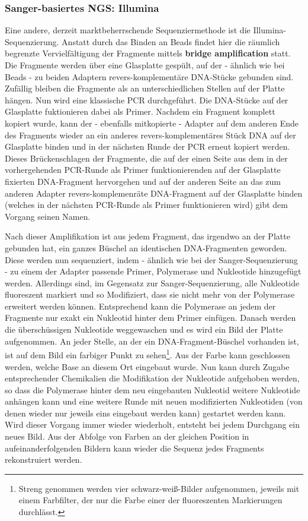 \subsubsection{Sanger-basiertes NGS: Illumina}

Eine andere, derzeit marktbeherrschende Sequenziermethode ist die Illumina-Sequenzierung. Anstatt durch das Binden an Beads findet hier die räumlich begrenzte Vervielfältigung der Fragmente mittels \textbf{bridge amplification} statt. Die Fragmente werden über eine Glasplatte gespült, auf der - ähnlich wie bei Beads - zu beiden Adaptern revers-komplementäre DNA-Stücke gebunden sind. Zufällig bleiben die Fragmente als an unterschiedlichen Stellen auf der Platte hängen. Nun wird eine klassische PCR durchgeführt. Die DNA-Stücke auf der Glasplatte fuktionieren dabei als Primer. Nachdem ein Fragment komplett kopiert wurde, kann der - ebenfalls mitkopierte - Adapter auf dem anderen Ende des Fragments wieder an ein anderes revers-komplementäres Stück DNA auf der Glasplatte binden und in der nächsten Runde der PCR erneut kopiert werden. Dieses Brückenschlagen der Fragmente, die auf der einen Seite aus dem in der vorhergehenden PCR-Runde als Primer funktionierenden auf der Glasplatte fixierten DNA-Fragment hervorgehen und auf der anderen Seite an das zum anderen Adapter revers-komplemenräte DNA-Fragment auf der Glasplatte binden (welches in der nächsten PCR-Runde als Primer funktionieren wird) gibt dem Vorgang seinen Namen.

Nach dieser Amplifikation ist aus jedem Fragment, das irgendwo an der Platte gebunden hat, ein ganzes Büschel an identischen DNA-Fragmenten geworden. Diese werden nun sequenziert, indem - ähnlich wie bei der Sanger-Sequenzierung - zu einem der Adapter passende Primer, Polymerase und Nukleotide hinzugefügt werden. Allerdings sind, im Gegensatz zur Sanger-Sequenzierung, alle Nukleotide fluoreszent markiert und so Modifiziert, dass sie nicht mehr von der Polymerase erweitert werden können. Entsprechend kann die Polymerase an jedem der Fragmente nur exakt ein Nukleotid hinter dem Primer einfügen. Danach werden die überschüssigen Nukleotide weggewaschen und es wird ein Bild der Platte aufgenommen. An jeder Stelle, an der ein DNA-Fragment-Büschel vorhanden ist, ist auf dem Bild ein farbiger Punkt zu sehen\footnote{Streng genommen werden vier schwarz-weiß-Bilder aufgenommen, jeweils mit einem Farbfilter, der nur die Farbe einer der fluoreszenten Markierungen durchlässt.}. Aus der Farbe kann geschlossen werden, welche Base an diesem Ort eingebaut wurde. Nun kann durch Zugabe entsprechender Chemikalien die Modifikation der Nukleotide aufgehoben werden, so dass die Polymerase hinter dem neu eingebauten Nukleotid weitere Nukleotide anhängen kann und eine weitere Runde mit neuen modifizierten Nukleotiden (von denen wieder nur jeweils eins eingebaut werden kann) gestartet werden kann. Wird dieser Vorgang immer wieder wiederholt, entsteht bei jedem Durchgang ein neues Bild. Aus der Abfolge von Farben an der gleichen Position in aufeinanderfolgenden Bildern kann wieder die Sequenz jedes Fragments rekonstruiert werden.

